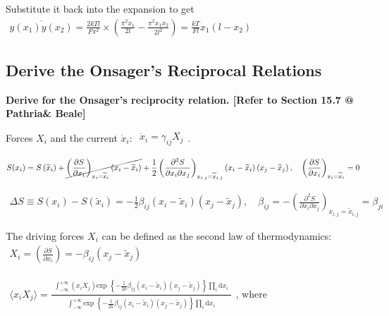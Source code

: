 \documentclass[../../main.tex]{subfiles}
\begin{document}
  Substitute it back into the expansion to get $\begin{aligned}
    \overline{y(x_{1})y(x_{2})} = \frac{2kTl}{F\pi^{2}}\times \left(
      \frac{\pi^{2}x_{1}}{2l} - \frac{\pi^{2}x_{1}x_{2}}{2l^{2}}
    \right) = \boxed{\frac{kT}{Fl}x_{1}(l-x_{2})}
  \end{aligned}$

\subsection{Derive the Onsager's Reciprocal Relations}

\textbf{Derive for the Onsager's reciprocity relation. [Refer to Section 15.7 @ Pathria\& Beale]}
  
  Forces $X_{i}$ and the current $\dot{x}_{i}$: $\begin{aligned}
    \dot{x}_{i} = \gamma_{ij}X_{j}
  \end{aligned}$. 
  
  $\begin{aligned}
    S(x_{i}) = 
    S\left(\widetilde{x}_{i}\right) 
    + \cancel{\left(\frac{\partial S}{\partial x_{i}}\right)_{x_{i}=\widetilde{x}_{i}}\left(x_{i} - \widetilde{x}_{i}\right)} 
    + \frac{1}{2}\left(\frac{\partial^{2}S}{\partial x_{i}\partial x_{j}}\right)_{x_{i,j}=\widetilde{x}_{i,j}}\left(x_{i} - \widetilde{x}_{i}\right)\left(x_{j}-\widetilde{x}_{j}\right),\quad \left(\frac{\partial S}{\partial x_{i}}\right)_{x_{i}=\widetilde{x}_{i}} = 0
  \end{aligned}$

  $\begin{aligned}
    \Delta S \equiv S(x_{i}) - S\left(\widetilde{x}_{i}\right) = -\frac{1}{2}\beta_{ij}\left(x_{i} - \widetilde{x}_{i}\right)\left(x_{j}-\widetilde{x}_{j}\right),\quad \beta_{ij} = -\left(\frac{\partial^{2}S}{\partial x_{i}\partial x_{j}}\right)_{x_{i,j}=\widetilde{x}_{i,j}} = \beta_{ji}
  \end{aligned}$

  The driving forces $X_{i}$ can be defined as the second law of thermodynamics: 
  $\begin{aligned}
    X_{i} = \left(\frac{\partial S}{\partial x_{i}}\right) = -\beta_{ij}\left(x_{j}-\widetilde{x}_{j}\right)
  \end{aligned}$

  $\begin{aligned}
    \langle x_{i}X_{j}\rangle = \frac{\begin{aligned}
      \int_{-\infty}^{+\infty}(x_{i}X_{j})\text{exp }\left\{-\frac{1}{2k}\beta_{ij}\left(x_{i}-\widetilde{x}_{i}\right)\left(x_{j}-\widetilde{x}_{j}\right)\right\}\prod_{i}\mathrm{d}x_{i}
    \end{aligned}}{\begin{aligned}
      \int_{-\infty}^{+\infty}\text{exp }\left\{-\frac{1}{2k}\beta_{ij}\left(x_{i}-\widetilde{x}_{i}\right)\left(x_{j}-\widetilde{x}_{j}\right)\right\}\prod_{i}\mathrm{d}x_{i}
    \end{aligned}}
  \end{aligned}$, where
\end{document}
